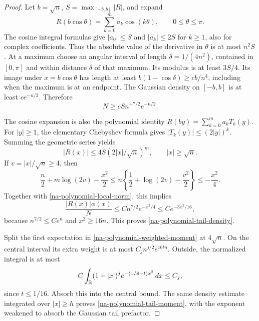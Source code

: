 \begin{proof}
Let $b=\sqrt n$, $S=\max_{[-b,b]}|R|$, and expand
\[
 R(b\cos\theta)=\sum_{k=0}^m a_k\cos(k\theta),
                       \qquad 0\le\theta\le\pi.
\]
The cosine integral formulas give $|a_0|\le S$ and $|a_k|\le2S$
for $k\ge1$, also for complex coefficients. Thus the absolute
value of the derivative in $\theta$ is at most $n^2S$.
At a maximum choose an angular interval of length
$\delta=1/(4n^2)$, contained in $[0,\pi]$ and within distance
$\delta$ of that maximum. Its modulus is at least $3S/4$.
Its image under $x=b\cos\theta$ has length at least
$b(1-\cos\delta)\ge cb/n^4$, including when the maximum is
at an endpoint. The Gaussian density on $[-b,b]$ is at least
$ce^{-n/2}$. Therefore
\begin{equation}
 N\ge cS n^{-7/2}e^{-n/2}.
 \label{na-polynomial-local-norm}
\end{equation}

The cosine expansion is also the polynomial identity
$R(by)=\sum_{k=0}^m a_kT_k(y)$. For $|y|\ge1$, the elementary
Chebyshev formula gives $|T_k(y)|\le(2|y|)^k$. Summing the
geometric series yields
\[
 |R(x)|\le4S(2|x|/\sqrt n)^m,\qquad |x|\ge\sqrt n.
\]
If $v=|x|/\sqrt n\ge4$, then
\[
 \frac n2+m\log(2v)-\frac{x^2}2
 \le n\left\{\frac12+\log(2v)-\frac{v^2}2\right\}
 \le-\frac{x^2}4.
\]
Together with \eqref{na-polynomial-local-norm}, this implies
\[
 \frac{|R(x)|\phi(x)}N
 \le Cn^{7/2}e^{-x^2/4}\le Ce^{-3x^2/16},
\]
because $n^{7/2}\le Ce^n$ and $x^2\ge16n$. This proves
\eqref{na-polynomial-tail-density}.

Split the first expectation in
\eqref{na-polynomial-weighted-moment} at $4\sqrt n$. On the
central interval its extra weight is at most
$C_jn^{j/2}e^{16tn}$. Outside, the normalized integral is at
most
\[
 C\int_\mathbb R(1+|x|)^je^{-(1/8-t)x^2}\,dx\le C_j,
\]
since $t\le1/16$. Absorb this into the central bound.
The same density estimate integrated over $|x|\ge h$ proves
\eqref{na-polynomial-tail-moment}, with the exponent weakened
to absorb the Gaussian tail prefactor.
\end{proof}

